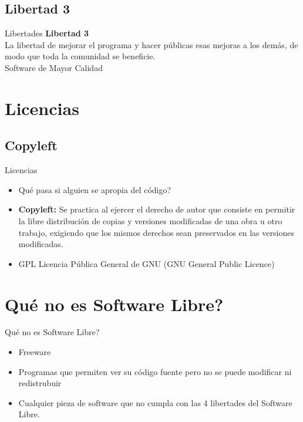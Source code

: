 \documentclass{beamer}
\begin{document}
\subsection{Libertad 3}  
\begin{frame}{Libertades}
  \centering 
    \alert {\bf Libertad 3} \\
      La libertad de mejorar el programa y hacer p\'ublicas esas mejoras a los dem\'as, de modo que toda la comunidad se beneficie.\\
      \pause
      \alert {Software de Mayor Calidad}
\end{frame}

\section{Licencias}

 \subsection{Copyleft}
  \begin{frame}{Licencias}
     \begin{itemize}
	\item Qu\'e pasa si alguien se apropia del c\'odigo?
	 \pause
	 \item {\bf Copyleft:} Se practica al ejercer el derecho de autor que consiste en permitir la libre distribuci\'on de copias 
		y versiones modificadas de una obra u otro trabajo, exigiendo que los mismos derechos sean preservados en las versiones 
		modificadas.
	\pause
	\item GPL Licencia P\'ublica General de GNU (GNU General Public Licence)
      \end{itemize}
  \end{frame}
\section{Qu\'e no es Software Libre?}
  \begin{frame}{Qu\'e no es Software Libre?}
   \begin{itemize}
      \item Freeware
      \pause
      \item Programas que permiten ver su c\'odigo fuente pero no se puede modificar ni redistrubuir
      \pause
      \item Cualquier pieza de software que no cumpla con las 4 libertades del Software Libre.
      \pause
   \end{itemize}
  \end{frame}
\end{document}
